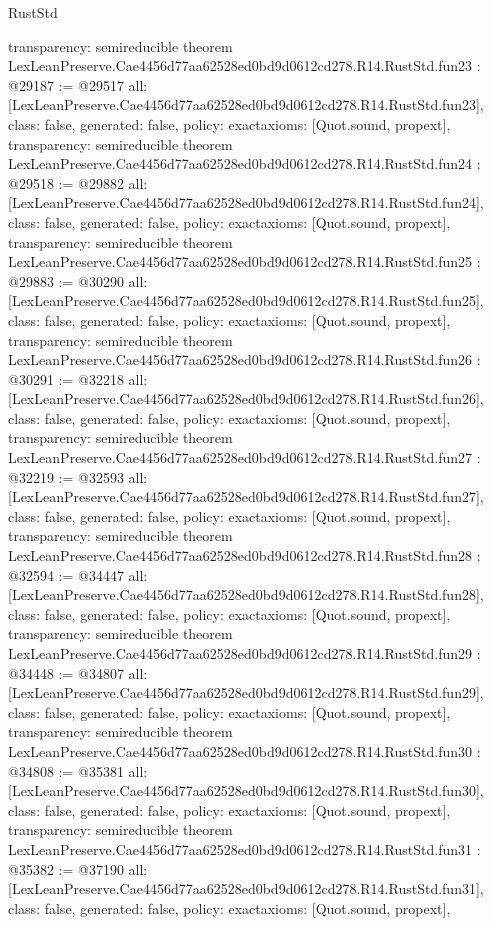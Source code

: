 \begin{lexlean}{RustStd}
\begin{coremodule}
{  transparency: semireducible
}
theorem LexLeanPreserve.Cae4456d77aa62528ed0bd9d0612cd278.R14.RustStd.fun23 : @29187 := @29517 {
  all: [LexLeanPreserve.Cae4456d77aa62528ed0bd9d0612cd278.R14.RustStd.fun23],
  class: false,
  generated: false,
  policy: exact{axioms: [Quot.sound, propext]},
  transparency: semireducible
}
theorem LexLeanPreserve.Cae4456d77aa62528ed0bd9d0612cd278.R14.RustStd.fun24 : @29518 := @29882 {
  all: [LexLeanPreserve.Cae4456d77aa62528ed0bd9d0612cd278.R14.RustStd.fun24],
  class: false,
  generated: false,
  policy: exact{axioms: [Quot.sound, propext]},
  transparency: semireducible
}
theorem LexLeanPreserve.Cae4456d77aa62528ed0bd9d0612cd278.R14.RustStd.fun25 : @29883 := @30290 {
  all: [LexLeanPreserve.Cae4456d77aa62528ed0bd9d0612cd278.R14.RustStd.fun25],
  class: false,
  generated: false,
  policy: exact{axioms: [Quot.sound, propext]},
  transparency: semireducible
}
theorem LexLeanPreserve.Cae4456d77aa62528ed0bd9d0612cd278.R14.RustStd.fun26 : @30291 := @32218 {
  all: [LexLeanPreserve.Cae4456d77aa62528ed0bd9d0612cd278.R14.RustStd.fun26],
  class: false,
  generated: false,
  policy: exact{axioms: [Quot.sound, propext]},
  transparency: semireducible
}
theorem LexLeanPreserve.Cae4456d77aa62528ed0bd9d0612cd278.R14.RustStd.fun27 : @32219 := @32593 {
  all: [LexLeanPreserve.Cae4456d77aa62528ed0bd9d0612cd278.R14.RustStd.fun27],
  class: false,
  generated: false,
  policy: exact{axioms: [Quot.sound, propext]},
  transparency: semireducible
}
theorem LexLeanPreserve.Cae4456d77aa62528ed0bd9d0612cd278.R14.RustStd.fun28 : @32594 := @34447 {
  all: [LexLeanPreserve.Cae4456d77aa62528ed0bd9d0612cd278.R14.RustStd.fun28],
  class: false,
  generated: false,
  policy: exact{axioms: [Quot.sound, propext]},
  transparency: semireducible
}
theorem LexLeanPreserve.Cae4456d77aa62528ed0bd9d0612cd278.R14.RustStd.fun29 : @34448 := @34807 {
  all: [LexLeanPreserve.Cae4456d77aa62528ed0bd9d0612cd278.R14.RustStd.fun29],
  class: false,
  generated: false,
  policy: exact{axioms: [Quot.sound, propext]},
  transparency: semireducible
}
theorem LexLeanPreserve.Cae4456d77aa62528ed0bd9d0612cd278.R14.RustStd.fun30 : @34808 := @35381 {
  all: [LexLeanPreserve.Cae4456d77aa62528ed0bd9d0612cd278.R14.RustStd.fun30],
  class: false,
  generated: false,
  policy: exact{axioms: [Quot.sound, propext]},
  transparency: semireducible
}
theorem LexLeanPreserve.Cae4456d77aa62528ed0bd9d0612cd278.R14.RustStd.fun31 : @35382 := @37190 {
  all: [LexLeanPreserve.Cae4456d77aa62528ed0bd9d0612cd278.R14.RustStd.fun31],
  class: false,
  generated: false,
  policy: exact{axioms: [Quot.sound, propext]},
}
\end{coremodule}
\end{lexlean}
